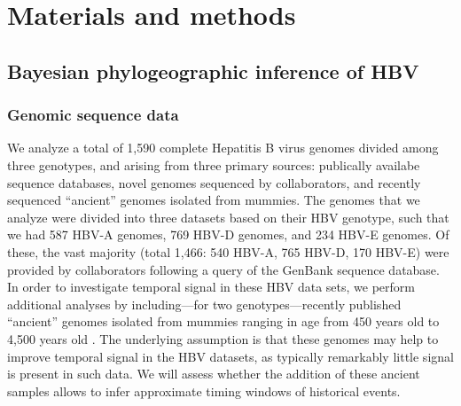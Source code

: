 \chapter{Materials and methods}
\label{ch:methodology}

%

\section{Bayesian phylogeographic inference of HBV}

\subsection{Genomic sequence data}
We analyze a total of 1,590 complete Hepatitis B virus genomes divided among three genotypes, and arising from three primary sources: publically availabe sequence databases, novel genomes sequenced by collaborators, and recently sequenced ``ancient'' genomes isolated from mummies.
The genomes that we analyze were divided into three datasets based on their HBV genotype, such that we had 587 HBV-A genomes, 769 HBV-D genomes, and 234 HBV-E genomes.
Of these, the vast majority (total 1,466: 540 HBV-A, 765 HBV-D, 170 HBV-E) were provided by collaborators following a query of the GenBank sequence database. %
In order to investigate temporal signal in these HBV data sets, we perform additional analyses by including---for two genotypes---recently published ``ancient'' genomes isolated from mummies ranging in age from 450 years old to 4,500 years old \cite{muhlemann2018ancient, ross2018paradox}. %
The underlying assumption is that these genomes may help to improve temporal signal in the HBV datasets, as typically remarkably little signal is present in such data.
We will assess whether the addition of these ancient samples allows to infer approximate timing windows of historical events.

